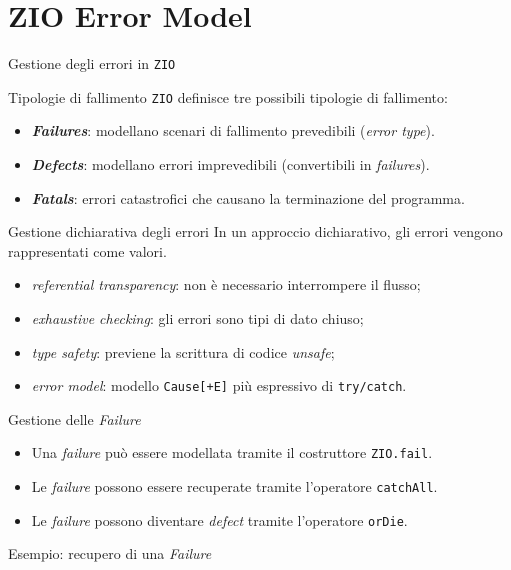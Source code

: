 \section{ZIO Error Model}

\begin{frame}{Gestione degli errori in \texttt{ZIO}}

  \begin{block}{Tipologie di fallimento}
    \texttt{ZIO} definisce tre possibili tipologie di fallimento:
    \begin{itemize}
      \item \textbf{\textit{Failures}}: modellano scenari di fallimento prevedibili (\textit{error type}).
      \item \textbf{\textit{Defects}}: modellano errori imprevedibili (convertibili in \textit{failures}).
      \item \textbf{\textit{Fatals}}: errori catastrofici che causano la terminazione del programma.
    \end{itemize}
  \end{block}

  \begin{block}{Gestione dichiarativa degli errori}
    In un approccio dichiarativo, gli errori vengono rappresentati come valori.
    \begin{itemize}
      \item \textit{referential transparency}: non è necessario interrompere il flusso; 
      \item \textit{exhaustive checking}: gli errori sono tipi di dato chiuso;
      \item \textit{type safety}: previene la scrittura di codice \textit{unsafe};
      \item \textit{error model}: modello \texttt{Cause[+E]} più espressivo di \texttt{try/catch}.
    \end{itemize}
  \end{block}
\end{frame}

\begin{frame}
  \begin{block}{Gestione delle \textit{Failure}}
    \begin{itemize}
      \item Una \textit{failure} può essere modellata tramite il costruttore \texttt{ZIO.fail}.
      \item Le \textit{failure} possono essere recuperate tramite l'operatore \texttt{catchAll}.
      \item Le \textit{failure} possono diventare \textit{defect} tramite l'operatore \texttt{orDie}.
    \end{itemize}
  \end{block}

  \begin{block}{Esempio: recupero di una \textit{Failure}}
    
  \end{block}
\end{frame}
